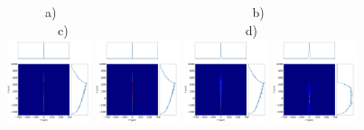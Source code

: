 \documentclass[a4paper, 11pt]{article}
\begin{document}
\begin{figure}[h]
\flushleft
~~~~~~a)~~~~~~~~~~~~~~~~~~~~~~~~~~~~~~~b)~~~~~~~~~~~~~~~~~~~~~~~~~~~c)~~~~~~~~~~~~~~~~~~~~~~~~~~~~d)\\
\centering
\includegraphics[width=0.22\textwidth]{figures/p2s_V.png}
\includegraphics[width=0.22\textwidth]{figures/p2s_K.png}
\includegraphics[width=0.22\textwidth]{figures/p2s_parabolic-cone.png}
\includegraphics[width=0.22\textwidth]{figures/p2s_toroid.png}


\end{figure}
\end{document}
